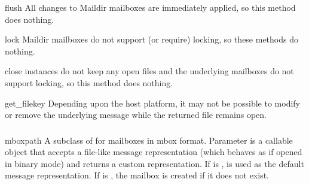 \begin{methoddesc}{flush}{}
All changes to Maildir mailboxes are immediately applied, so this method does
nothing.
\end{methoddesc}

\begin{methoddesc}{lock}{}
Maildir mailboxes do not support (or require) locking, so these methods do
nothing. 
\end{methoddesc}

\begin{methoddesc}{close}{}
 instances do not keep any open files and the underlying
mailboxes do not support locking, so this method does nothing.
\end{methoddesc}

\begin{methoddesc}{get_file}{key}
Depending upon the host platform, it may not be possible to modify or remove
the underlying message while the returned file remains open.
\end{methoddesc}

\begin{seealso}
\end{seealso}

\subsubsection{}
\label{mailbox-mbox}

\begin{classdesc}{mbox}{path}
A subclass of  for mailboxes in mbox format. Parameter
 is a callable object that accepts a file-like message
representation (which behaves as if opened in binary mode) and returns a custom
representation. If  is ,  is used as
the default message representation. If  is , the mailbox
is created if it does not exist.
\end{classdesc}

